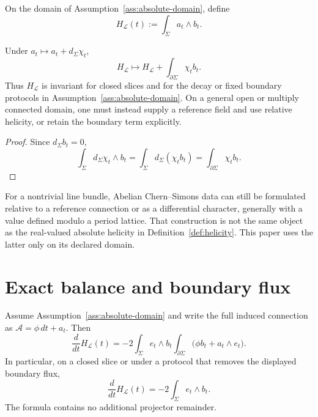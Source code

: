 \documentclass[11pt]{article}
\newcommand{\cL}{\mathcal L}
\begin{document}
\par\medskip
\begin{definition}\label{def:helicity}
On the domain of Assumption~\ref{ass:absolute-domain}, define
\[
H_\cL(t):=\int_\Sigma a_t\wedge b_t.
\]
\end{definition}

\begin{proposition}\label{prop:gauge-change}
Under \(a_t\mapsto a_t+d_\Sigma\chi_t\),
\[
H_\cL\mapsto H_\cL+\int_{\partial\Sigma}\chi_t b_t.
\]
Thus \(H_\cL\) is invariant for closed slices and for the decay or fixed
boundary protocols in Assumption~\ref{ass:absolute-domain}.  On a general open or
multiply connected domain, one must instead supply a reference field and use
relative helicity, or retain the boundary term explicitly.
\end{proposition}

\begin{proof}
Since \(d_\Sigma b_t=0\),
\[
\int_\Sigma d_\Sigma\chi_t\wedge b_t
 =\int_\Sigma d_\Sigma(\chi_t b_t)
 =\int_{\partial\Sigma}\chi_t b_t.
\]
\end{proof}

For a nontrivial line bundle, Abelian Chern--Simons data can still be formulated
relative to a reference connection or as a differential character, generally
with a value defined modulo a period lattice.  That construction is not the
same object as the real-valued absolute helicity in
Definition~\ref{def:helicity}.  This
paper uses the latter only on its declared domain.

\section{Exact balance and boundary flux}
\label{sec:balance}

\begin{theorem}\label{thm:balance}
Assume Assumption~\ref{ass:absolute-domain} and write the full induced connection as
\(\mathcal A=\phi\,dt+a_t\).  Then
\begin{equation}
\frac{d}{dt}H_\cL(t)
=-2\int_\Sigma e_t\wedge b_t
 \int_{\partial\Sigma}\bigl(\phi b_t+a_t\wedge e_t\bigr).
\label{eq:balance}
\end{equation}
In particular, on a closed slice or under a protocol that removes the displayed
boundary flux,
\[
\frac{d}{dt}H_\cL(t)=-2\int_\Sigma e_t\wedge b_t.
\]
The formula contains no additional projector remainder.
\end{theorem}
\end{document}
